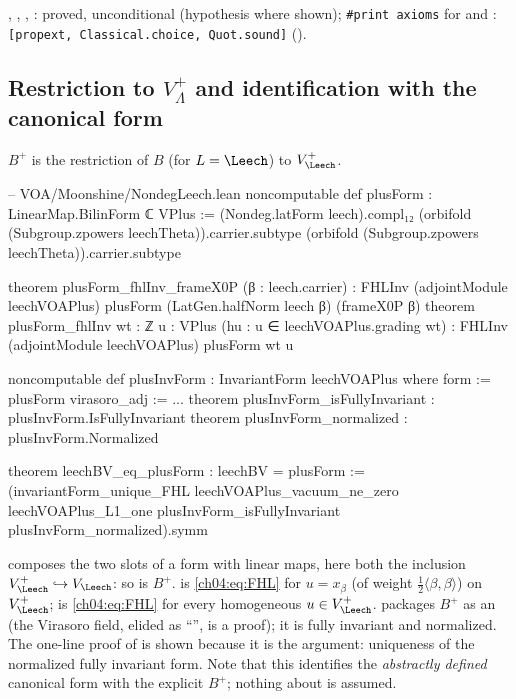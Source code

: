 \begin{status}
, , ,
: proved, unconditional (hypothesis  where shown);
\texttt{\#print axioms} for  and :
\texttt{[propext, Classical.choice, Quot.sound]} ().
\end{status}

\subsection{Restriction to \texorpdfstring{$V_\Lambda^+$}{V+} and identification with the canonical form}

\begin{definition}\label{ch04:def:plusform}
$B^+$ is the restriction of $B$ (for $L=\Leech$) to $V_\Leech^+$.
\end{definition}

\begin{leancode}
-- VOA/Moonshine/NondegLeech.lean
noncomputable def plusForm : LinearMap.BilinForm ℂ VPlus :=
  (Nondeg.latForm leech).compl₁₂ (orbifold (Subgroup.zpowers leechTheta)).carrier.subtype
    (orbifold (Subgroup.zpowers leechTheta)).carrier.subtype

theorem plusForm_fhlInv_frameX0P (β : leech.carrier) :
    FHLInv (adjointModule leechVOAPlus) plusForm (LatGen.halfNorm leech β) (frameX0P β)
theorem plusForm_fhlInv {wt : ℤ} {u : VPlus} (hu : u ∈ leechVOAPlus.grading wt) :
    FHLInv (adjointModule leechVOAPlus) plusForm wt u

noncomputable def plusInvForm : InvariantForm leechVOAPlus where
  form := plusForm
  virasoro_adj := ...
theorem plusInvForm_isFullyInvariant : plusInvForm.IsFullyInvariant
theorem plusInvForm_normalized : plusInvForm.Normalized

theorem leechBV_eq_plusForm : leechBV = plusForm :=
  (invariantForm_unique_FHL leechVOAPlus_vacuum_ne_zero leechVOAPlus_L1_one
    plusInvForm_isFullyInvariant plusInvForm_normalized).symm
\end{leancode}

\begin{dictionary}
 composes the two slots of a form with linear maps, here both the inclusion
$V_\Leech^+\hookrightarrow V_\Leech$: so  is $B^+$. 
is \eqref{ch04:eq:FHL} for $u=x_\beta$ (of weight $\tfrac12\langle\beta,\beta\rangle$) on $V_\Leech^+$;
 is \eqref{ch04:eq:FHL} for every homogeneous $u\in V_\Leech^+$.
 packages $B^+$ as an  (the Virasoro field, elided as
``'', is a proof); it is fully invariant and normalized. The one-line proof of
 is shown because it is the argument: uniqueness of the normalized fully
invariant form. Note that this identifies the \emph{abstractly defined} canonical form 
with the explicit $B^+$; nothing about  is assumed.
\end{dictionary}

